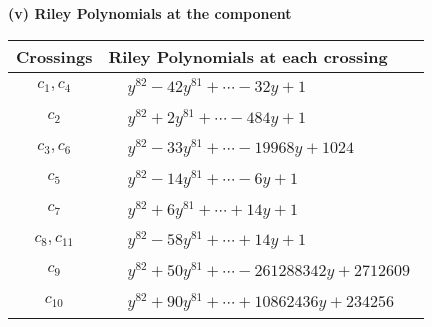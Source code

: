 \documentclass[1p]{elsarticle_modified}
\theoremstyle{definition}
\begin{document}
\newpage\renewcommand{\arraystretch}{1}
\flushleft \textbf{(v) Riley Polynomials at the component}\newline \\
\begin{tabular}{m{50pt}|m{274pt}}
Crossings & \hspace{64pt}Riley Polynomials at each crossing \\
\hline $$\begin{aligned}c_{1},c_{4}\end{aligned}$$&$\begin{aligned}
&y^{82}-42 y^{81}+\cdots-32 y+1
\end{aligned}$\\
\hline $$\begin{aligned}c_{2}\end{aligned}$$&$\begin{aligned}
&y^{82}+2 y^{81}+\cdots-484 y+1
\end{aligned}$\\
\hline $$\begin{aligned}c_{3},c_{6}\end{aligned}$$&$\begin{aligned}
&y^{82}-33 y^{81}+\cdots-19968 y+1024
\end{aligned}$\\
\hline $$\begin{aligned}c_{5}\end{aligned}$$&$\begin{aligned}
&y^{82}-14 y^{81}+\cdots-6 y+1
\end{aligned}$\\
\hline $$\begin{aligned}c_{7}\end{aligned}$$&$\begin{aligned}
&y^{82}+6 y^{81}+\cdots+14 y+1
\end{aligned}$\\
\hline $$\begin{aligned}c_{8},c_{11}\end{aligned}$$&$\begin{aligned}
&y^{82}-58 y^{81}+\cdots+14 y+1
\end{aligned}$\\
\hline $$\begin{aligned}c_{9}\end{aligned}$$&$\begin{aligned}
&y^{82}+50 y^{81}+\cdots-261288342 y+2712609
\end{aligned}$\\
\hline $$\begin{aligned}c_{10}\end{aligned}$$&$\begin{aligned}
&y^{82}+90 y^{81}+\cdots+10862436 y+234256
\end{aligned}$\\
\hline
\end{tabular}\\~\\
\end{document}
